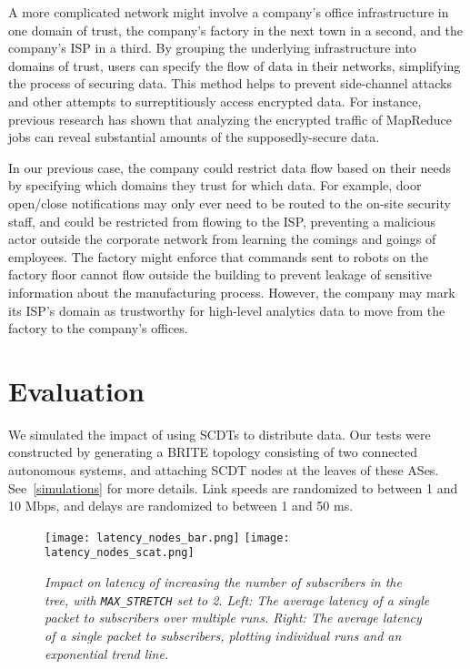 A more complicated network might involve a company's office infrastructure in one domain of trust, the company's factory in the next town in a second, and the company's ISP in a third. By grouping the underlying infrastructure into domains of trust, users can specify the flow of data in their networks, simplifying the process of securing data. This method helps to prevent side-channel attacks and other attempts to surreptitiously access encrypted data. For instance, previous research \cite{sidechannel} has shown that analyzing the encrypted traffic of MapReduce jobs can reveal substantial amounts of the supposedly-secure data.

In our previous case, the company could restrict data flow based on their needs by specifying which domains they trust for which data. For example, door open/close notifications may only ever need to be routed to the on-site security staff, and could be restricted from flowing to the ISP, preventing a malicious actor outside the corporate network from learning the comings and goings of employees. The factory might enforce that commands sent to robots on the factory floor cannot flow outside the building to prevent leakage of sensitive information about the manufacturing process. However, the company may mark its ISP's domain as trustworthy for high-level analytics data to move from the factory to the company's offices. 

\section{Evaluation}
\label{scdt-eval}

We simulated the impact of using SCDTs to distribute data. Our tests were constructed by generating a BRITE \cite{brite} topology consisting of two connected autonomous systems, and attaching SCDT nodes at the leaves of these ASes.  See~\autoref{simulations} for more details. Link speeds are randomized to between 1 and 10 Mbps, and delays are randomized to between 1 and 50 ms.

\begin{figure}[h]
	\begin{center}
		\texttt{[image: latency\_nodes\_bar.png]}
		\texttt{[image: latency\_nodes\_scat.png]}
	\end{center}
	\vspace{-1.3em}
	\caption{\small \itshape Impact on latency of increasing the number of subscribers in the tree, with \texttt{MAX\_STRETCH} set to 2. Left: The average latency of a single packet to subscribers over multiple runs. Right: The average latency of a single packet to subscribers, plotting individual runs and an exponential trend line.}
	\vspace{-1em}
	\label{fig:latency_nodes}
\end{figure}

